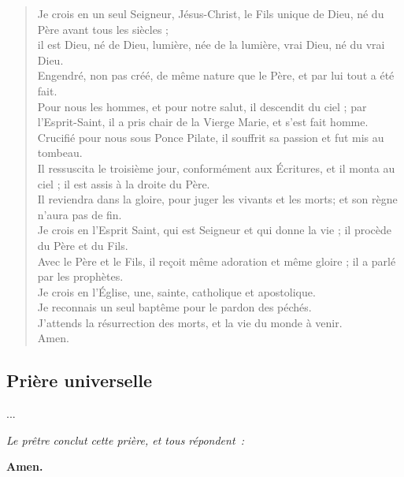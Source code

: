 {\begin{minipage}[t]{0.5\textwidth}
\begin{verse}
 Je crois en un seul Seigneur, Jésus-Christ, le Fils unique de Dieu, né du Père avant tous les siècles ;\\
 il est Dieu, né de Dieu, lumière, née de la lumière, vrai Dieu, né du vrai Dieu. \\
 Engendré, non pas créé, de même nature que le Père, et par lui tout a été fait. \\
 Pour nous les hommes, et pour notre salut, il descendit du ciel ; par l'Esprit-Saint, il a pris chair de la Vierge Marie, et s'est fait homme. \\
 Crucifié pour nous sous Ponce Pilate, il souffrit sa passion et fut mis au tombeau. \\
 Il ressuscita le troisième jour, conformément aux Écritures, et il monta au ciel ; il est assis à la droite du Père. \\
 Il reviendra dans la gloire, pour juger les vivants et les morts; et son règne n'aura pas de fin.\\
 Je crois en l'Esprit Saint, qui est Seigneur et qui donne la vie ; il procède du Père et du Fils. \\
 Avec le Père et le Fils, il reçoit même adoration et même gloire ; il a parlé par les prophètes. \\
 Je crois en l'Église, une, sainte, catholique et apostolique. \\
 Je reconnais un seul baptême pour le pardon des péchés. \\
 J'attends la résurrection des morts, et la vie du monde à venir. \\
 Amen.
\end{verse}
\end{minipage}
}



\subsection*{Prière universelle}

...

\emph{Le prêtre conclut cette prière, et tous répondent~:}

{\bf Amen.}



